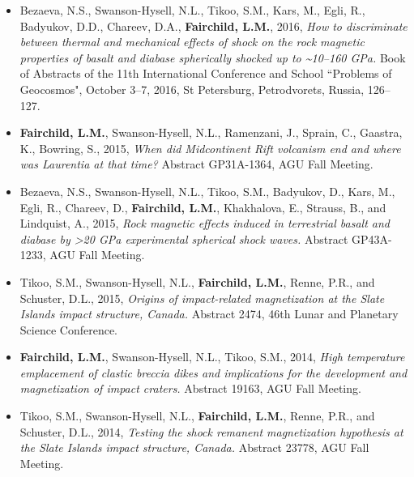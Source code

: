 \documentclass[11pt,a4paper,sans]{moderncv}
\begin{document}
\begin{itemize}
    \item{Bezaeva, N.S., Swanson-Hysell, N.L., Tikoo, S.M., Kars, M., Egli, R.,
            Badyukov, D.D., Chareev, D.A., \textbf{Fairchild, L.M.}, 2016,
            \textit{How to discriminate between thermal and mechanical effects
                of shock on the rock magnetic properties of basalt and diabase
            spherically shocked up to \textasciitilde 10--160 GPa.} Book of
            Abstracts of the 11th International Conference and School ``Problems
            of Geocosmos", October 3--7, 2016, St Petersburg, Petrodvorets,
        Russia, 126--127.}

    \item{\textbf{Fairchild, L.M.}, Swanson-Hysell, N.L., Ramenzani, J., Sprain,
            C., Gaastra, K., Bowring, S., 2015, \textit{When did Midcontinent
            Rift volcanism end and where was Laurentia at that time?} Abstract
        GP31A-1364, AGU Fall Meeting.}

    \item{Bezaeva, N.S., Swanson-Hysell, N.L., Tikoo, S.M., Badyukov, D., Kars,
            M., Egli, R., Chareev, D., \textbf{Fairchild, L.M.}, Khakhalova, E.,
            Strauss, B., and Lindquist, A., 2015, \textit{Rock magnetic effects
                induced in terrestrial basalt and diabase by >20 GPa
            experimental spherical shock waves.} Abstract GP43A-1233, AGU
        Fall Meeting.}

    \item{Tikoo, S.M., Swanson-Hysell, N.L., \textbf{Fairchild, L.M.}, Renne,
            P.R., and Schuster, D.L., 2015, \textit{Origins of impact-related
            magnetization at the Slate Islands impact structure, Canada.}
        Abstract 2474, 46th Lunar and Planetary Science Conference.}

    \item{\textbf{Fairchild, L.M.}, Swanson-Hysell, N.L., Tikoo, S.M., 2014,
            \textit{High temperature emplacement of clastic breccia dikes and
                implications for the development and magnetization of impact
        craters.} Abstract 19163, AGU Fall Meeting.}

    \item{Tikoo, S.M., Swanson-Hysell, N.L., \textbf{Fairchild, L.M.}, Renne,
            P.R., and Schuster, D.L., 2014, \textit{Testing the shock remanent
                magnetization hypothesis at the Slate Islands impact structure,
        Canada.} Abstract 23778, AGU Fall Meeting.}

\end{itemize}
\end{document}

